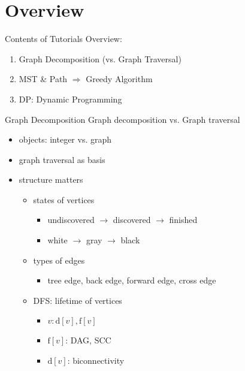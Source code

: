 \section{Overview}

\begin{frame}{Contents of Tutorials}
  Overview:
  \begin{enumerate}
    \item Graph Decomposition {\scriptsize (vs. Graph Traversal)}
    \item MST \& Path $\Rightarrow$ Greedy Algorithm
    \item DP: Dynamic Programming
  \end{enumerate}
\end{frame}
\begin{frame}{Graph Decomposition}
  Graph decomposition vs. Graph traversal
  \begin{itemize}
    \item objects: integer vs. graph
    \item graph traversal as basis
    \item structure matters
      \begin{itemize}
	\item states of vertices
	  \begin{itemize}
	    \item undiscovered $\to$ discovered $\to$ finished
	    \item white $\to$ gray $\to$ black
	  \end{itemize}
	\item types of edges
	  \begin{itemize}
	    \item tree edge, back edge, forward edge, cross edge
	  \end{itemize}
	\item DFS: lifetime of vertices
	  \begin{itemize}
	    \item $v: \text{d}[v], \text{f}[v]$
	    \item $\text{f}[v]$: DAG, SCC
	    \item $\text{d}[v]$: biconnectivity
	  \end{itemize}
      \end{itemize}
  \end{itemize}
\end{frame}
